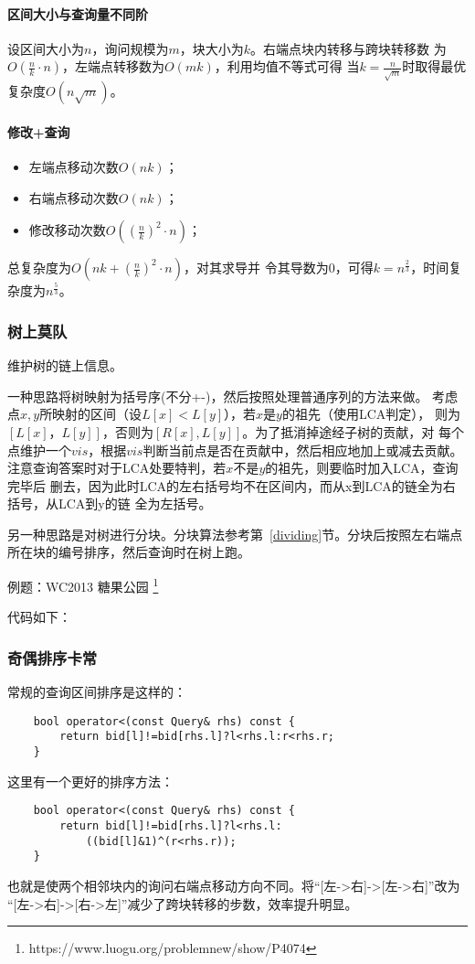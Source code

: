 \paragraph{区间大小与查询量不同阶}
设区间大小为$n$，询问规模为$m$，块大小为$k$。右端点块内转移与跨块转移数
为$O(\frac{n}{k}\cdot n)$，左端点转移数为$O(mk)$，利用均值不等式可得
当$k=\frac{n}{\sqrt{m}}$时取得最优复杂度$O(n\sqrt{m})$。
\paragraph{修改+查询}
\begin{itemize}
	\item 左端点移动次数$O(nk)$；
	\item 右端点移动次数$O(nk)$；
	\item 修改移动次数$O(\left(\frac{n}{k}\right)^2\cdot n)$；
\end{itemize}
总复杂度为$O(nk+\left(\frac{n}{k}\right)^2\cdot n)$，对其求导并
令其导数为0，可得$k=n^\frac{2}{3}$，时间复杂度为$n^\frac{5}{3}$。
\subsubsection{树上莫队}
维护树的链上信息。

一种思路将树映射为括号序(不分+-)，然后按照处理普通序列的方法来做。
考虑点$x,y$所映射的区间（设$L[x]<L[y]$），若$x$是$y$的祖先（使用LCA判定），
则为$[L[x]，L[y]]$，否则为$[R[x],L[y]]$。为了抵消掉途经子树的贡献，对
每个点维护一个$vis$，根据$vis$判断当前点是否在贡献中，然后相应地加上或减去贡献。
注意查询答案时对于LCA处要特判，若$x$不是$y$的祖先，则要临时加入LCA，查询完毕后
删去，因为此时LCA的左右括号均不在区间内，而从x到LCA的链全为右括号，从LCA到y的链
全为左括号。

另一种思路是对树进行分块。分块算法参考第~\ref{dividing}节。分块后按照左右端点
所在块的编号排序，然后查询时在树上跑。

例题：WC2013 糖果公园
\footnote{https://www.luogu.org/problemnew/show/P4074}

代码如下：

\subsubsection{奇偶排序卡常}
常规的查询区间排序是这样的：
\begin{lstlisting}
    bool operator<(const Query& rhs) const {
        return bid[l]!=bid[rhs.l]?l<rhs.l:r<rhs.r;
    }
\end{lstlisting}
这里有一个更好的排序方法：
\begin{lstlisting}
    bool operator<(const Query& rhs) const {
        return bid[l]!=bid[rhs.l]?l<rhs.l:
            ((bid[l]&1)^(r<rhs.r));
    }
\end{lstlisting}
也就是使两个相邻块内的询问右端点移动方向不同。将``[左->右]->[左->右]''改为
``[左->右]->[右->左]''减少了跨块转移的步数，效率提升明显。

